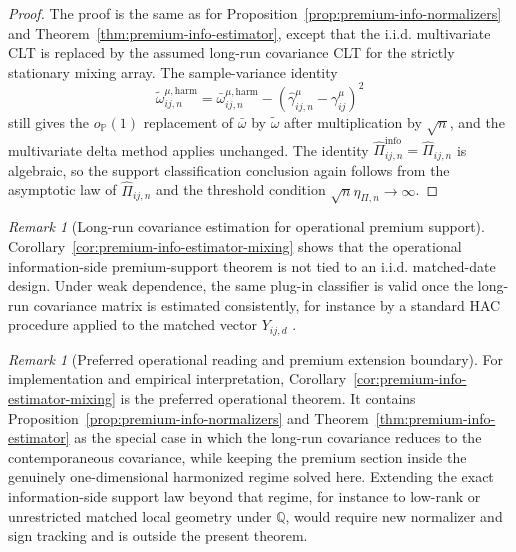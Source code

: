 \documentclass[11pt,a4paper]{amsart}
\theoremstyle{plain}
\theoremstyle{definition}
\theoremstyle{remark}
\newtheorem{remark}[theorem]{Remark}
\newcommand{\PP}{\mathbb{P}}
\newcommand{\QQ}{\mathbb{Q}}
\begin{document}
\begin{proof}
The proof is the same as for Proposition~\ref{prop:premium-info-normalizers} and
Theorem~\ref{thm:premium-info-estimator}, except that the i.i.d. multivariate CLT is replaced by
the assumed long-run covariance CLT for the strictly stationary mixing array.  The sample-variance
identity
\[
        \widetilde\omega_{ij,n}^{\mu,\mathrm{harm}}
        =
        \bar\omega_{ij,n}^{\mu,\mathrm{harm}}
        -
        (\widehat\gamma_{ij,n}^\mu-\gamma_{ij}^\mu)^2
\]
still gives the \(o_\PP(1)\) replacement of \(\bar\omega\) by \(\widetilde\omega\) after
multiplication by \(\sqrt{n}\), and the multivariate delta method applies unchanged.  The identity
\(\widehat\Pi_{ij,n}^{\mathrm{info}}=\widehat\Pi_{ij,n}\) is algebraic, so the support
classification conclusion again follows from the asymptotic law of \(\widehat\Pi_{ij,n}\) and the
threshold condition \(\sqrt{n}\eta_{\Pi,n}\to\infty\).
\end{proof}

\begin{remark}[Long-run covariance estimation for operational premium support]\label{rem:premium-info-hac}
Corollary~\ref{cor:premium-info-estimator-mixing} shows that the operational information-side
premium-support theorem is not tied to an i.i.d. matched-date design.  Under weak dependence, the
same plug-in classifier is valid once the long-run covariance matrix is estimated consistently, for
instance by a standard HAC procedure applied to the matched vector \(Y_{ij,d}\)
\cite{neweyWest1987,andrews1991}.
\end{remark}

\begin{remark}[Preferred operational reading and premium extension boundary]\label{rem:premium-info-default}
For implementation and empirical interpretation,
Corollary~\ref{cor:premium-info-estimator-mixing} is the preferred operational theorem.  It
contains Proposition~\ref{prop:premium-info-normalizers} and
Theorem~\ref{thm:premium-info-estimator} as the special case in which the long-run covariance
reduces to the contemporaneous covariance, while keeping the premium section inside the genuinely
one-dimensional harmonized regime solved here.  Extending the exact information-side support law
beyond that regime, for instance to low-rank or unrestricted matched local geometry under \(\QQ\),
would require new normalizer and sign tracking and is outside the present theorem.
\end{remark}
\end{document}
